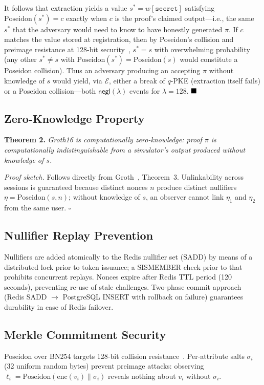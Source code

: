 \documentclass[journal,twoside,10pt]{IEEEtran}
\begin{document}
It follows that extraction yields a value $s^* = w[\texttt{secret}]$ satisfying $\mathrm{Poseidon}(s^*) = c$ exactly when $c$ is the proof's claimed output---i.e., the same $s^*$ that the adversary would need to know to have honestly generated $\pi$. If $c$ matches the value stored at registration, then by Poseidon's collision and preimage resistance at 128-bit security~\cite{poseidon}, $s^* = s$ with overwhelming probability (any other $s^* \neq s$ with $\mathrm{Poseidon}(s^*){=}\mathrm{Poseidon}(s)$ would constitute a Poseidon collision). Thus an adversary producing an accepting $\pi$ without knowledge of $s$ would yield, via $\mathcal{E}$, either a break of $q$-PKE (extraction itself fails) or a Poseidon collision---both $\mathsf{negl}(\lambda)$ events for $\lambda{=}128$. $\hfill\blacksquare$

\subsection{Zero-Knowledge Property}
\textbf{Theorem 2.} \textit{Groth16 is computationally zero-knowledge: proof
$\pi$ is computationally indistinguishable from a simulator's output
produced without knowledge of $s$.}

\textit{Proof sketch.} Follows directly from Groth~\cite{groth16}, Theorem~3.
Unlinkability across sessions is guaranteed because distinct nonces $n$
produce distinct nullifiers $\eta = \mathrm{Poseidon}(s, n)$; without
knowledge of $s$, an observer cannot link $\eta_1$ and $\eta_2$ from the
same user. \hfill$\square$

\subsection{Nullifier Replay Prevention}
Nullifiers are added atomically to the Redis nullifier set (SADD) by means of
a distributed lock prior to token issuance; a SISMEMBER check prior to that
prohibits concurrent replays. Nonces expire after Redis TTL period (120
seconds), preventing re-use of stale challenges. Two-phase commit approach
(Redis SADD $\rightarrow$ PostgreSQL INSERT with rollback on failure)
guarantees durability in case of Redis failover.

\subsection{Merkle Commitment Security}
Poseidon over BN254 targets 128-bit collision resistance~\cite{poseidon}.
Per-attribute salts $\sigma_i$ (32 uniform random bytes) prevent preimage
attacks: observing $\ell_i = \mathrm{Poseidon}(\mathrm{enc}(v_i) \| \sigma_i)$
reveals nothing about $v_i$ without $\sigma_i$.
\end{document}
